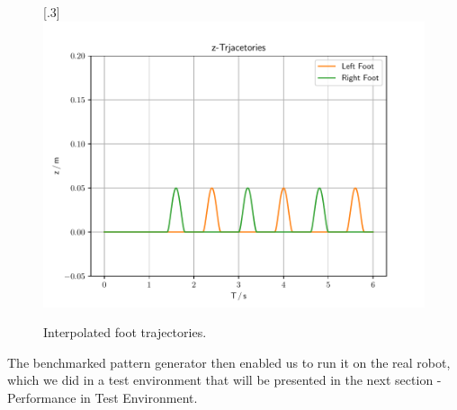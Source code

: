 \begin{figure}[h]
	[.3\linewidth]{\includegraphics[scale=.3]{chapters/05_experiments/01_user_controlled_walking/01_benchmarking/interpolated_z_trajectories.pdf}}
	\caption{Interpolated foot trajectories.}
	\label{fig::511_benchmarking_inter}
\end{figure}
 The benchmarked pattern generator then enabled us to run it on the real robot, which we did in a test environment that will be presented in the next section - Performance in Test Environment.
